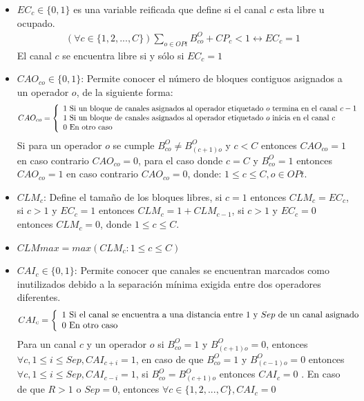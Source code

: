 \begin{itemize}
	\item{$EC_{c} \in \{0,1\}$ es una variable reificada que define si el canal $c$ esta libre u ocupado.
	\begin{displaymath}
		\begin{array}{cc}
			(\forall c \in \{1,2,...,C\} ) \sum \limits_{o \in OPt} B^{O}_{co} + CP_{c} < 1 \leftrightarrow EC_{c} = 1
		\end{array}
	\end{displaymath}
	El canal $c$ se encuentra libre si y sólo si $EC_{c} = 1$}
	\item {$CAO_{co} \in \{0,1\}$: Permite conocer el número de bloques contiguos asignados a un operador $o$, de la siguiente forma:
	\begin{displaymath}
		CAO_{co} = \left\{ \begin{array}{lp{5cm}} 1  \textrm{ Si un bloque de canales asignados al operador etiquetado $o$ termina en el canal $c-1$ } \\1 \textrm{ Si un bloque de canales asignados al operador etiquetado $o$ inicia en el canal $c$ } \\0 \textrm{ En otro caso}\end{array}\right.
	\end{displaymath}	
	Si para un operador $o$ se cumple $B^{O}_{co} \neq B^{O}_{(c+1)o}$ y $c<C$ entonces $CAO_{co}=1$ en caso contrario $CAO_{co}=0$, para el caso donde $c=C$ y $B^{O}_{co}=1$ entonces $CAO_{co}=1$ en caso contrario $CAO_{co}=0$, donde: $1 \leq c \leq C, o \in OPt$.}
	\item $CLM_{c}$: Define el tamaño de los bloques libres, si $c=1$ entonces $CLM_{c}=EC_{c}$, si $c>1$ y $EC_{c}=1$ entonces  $CLM_{c}=1+CLM_{c-1}$, si $c > 1$ y $EC_{c}=0$  entonces $CLM_{c}=0$, donde $1 \leq c \leq C$.
	\item $CLMmax = max(CLM_c: 1 \leq c \leq C)$
	\item {$CAI_{c} \in \{0,1\}$: Permite conocer que canales se encuentran marcados como inutilizados debido a la separación mínima exigida entre dos operadores diferentes.
	\begin{displaymath}
		CAI_{c} = \left\{ \begin{array}{lp{5cm}} 1  \textrm{ Si el canal se encuentra a una distancia entre $1$ y $Sep$ de un canal asignado} \\0 \textrm{ En otro caso } \end{array}\right.
	\end{displaymath}		
	Para un canal $c$ y un operador $o$ si $B^{O}_{co}=1$ y $B^{O}_{(c+1)o}=0$, entonces $\forall c, 1 \leq i \leq Sep, CAI_{c+i}= 1$, en caso de que $B^{O}_{co}=1$ y $B^{O}_{(c-1)o}=0$ entonces  $\forall c, 1 \leq i \leq Sep, CAI_{c-i} = 1$, si $B^{O}_{co} = B^{O}_{(c+1)o}$ entonces $CAI_{c}=0$  . En caso de que $R>1$ o $Sep=0$, entonces $\forall c \in \{1,2,...,C\} , CAI_{c}=0$}
\end{itemize}


